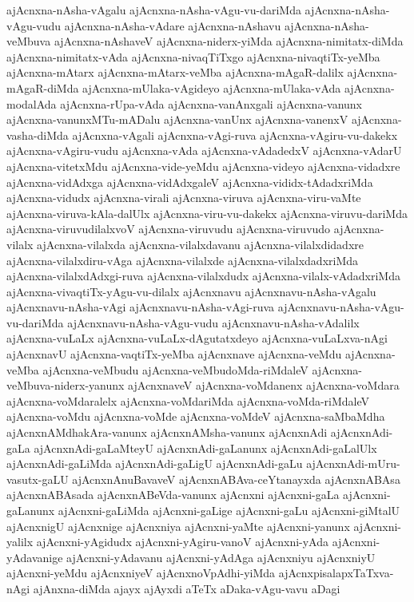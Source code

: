 {ajAcnxna-nAsha-vAgalu
ajAcnxna-nAsha-vAgu-vu-dariMda
ajAcnxna-nAsha-vAgu-vudu
ajAcnxna-nAsha-vAdare
ajAcnxna-nAshavu
ajAcnxna-nAsha-veMbuva
ajAcnxna-nAshaveV
ajAcnxna-niderx-yiMda
ajAcnxna-nimitatx-diMda
ajAcnxna-nimitatx-vAda
ajAcnxna-nivaqTiTxgo
ajAcnxna-nivaqtiTx-yeMba
ajAcnxna-mAtarx
ajAcnxna-mAtarx-veMba
ajAcnxna-mAgaR-dalilx
ajAcnxna-mAgaR-diMda
ajAcnxna-mUlaka-vAgideyo
ajAcnxna-mUlaka-vAda
ajAcnxna-modalAda
ajAcnxna-rUpa-vAda
ajAcnxna-vanAnxgali
ajAcnxna-vanunx
ajAcnxna-vanunxMTu-mADalu
ajAcnxna-vanUnx
ajAcnxna-vanenxV
ajAcnxna-vasha-diMda
ajAcnxna-vAgali
ajAcnxna-vAgi-ruva
ajAcnxna-vAgiru-vu-dakekx
ajAcnxna-vAgiru-vudu
ajAcnxna-vAda
ajAcnxna-vAdadedxV
ajAcnxna-vAdarU
ajAcnxna-vitetxMdu
ajAcnxna-vide-yeMdu
ajAcnxna-videyo
ajAcnxna-vidadxre
ajAcnxna-vidAdxga
ajAcnxna-vidAdxgaleV
ajAcnxna-vididx-tAdadxriMda
ajAcnxna-vidudx
ajAcnxna-virali
ajAcnxna-viruva
ajAcnxna-viru-vaMte
ajAcnxna-viruva-kAla-dalUlx
ajAcnxna-viru-vu-dakekx
ajAcnxna-viruvu-dariMda
ajAcnxna-viruvudilalxvoV
ajAcnxna-viruvudu
ajAcnxna-viruvudo
ajAcnxna-vilalx
ajAcnxna-vilalxda
ajAcnxna-vilalxdavanu
ajAcnxna-vilalxdidadxre
ajAcnxna-vilalxdiru-vAga
ajAcnxna-vilalxde
ajAcnxna-vilalxdadxriMda
ajAcnxna-vilalxdAdxgi-ruva
ajAcnxna-vilalxdudx
ajAcnxna-vilalx-vAdadxriMda
ajAcnxna-vivaqtiTx-yAgu-vu-dilalx
ajAcnxnavu
ajAcnxnavu-nAsha-vAgalu
ajAcnxnavu-nAsha-vAgi
ajAcnxnavu-nAsha-vAgi-ruva
ajAcnxnavu-nAsha-vAgu-vu-dariMda
ajAcnxnavu-nAsha-vAgu-vudu
ajAcnxnavu-nAsha-vAdalilx
ajAcnxna-vuLaLx
ajAcnxna-vuLaLx-dAgutatxdeyo
ajAcnxna-vuLaLxva-nAgi
ajAcnxnavU
ajAcnxna-vaqtiTx-yeMba
ajAcnxnave
ajAcnxna-veMdu
ajAcnxna-veMba
ajAcnxna-veMbudu
ajAcnxna-veMbudoMda-riMdaleV
ajAcnxna-veMbuva-niderx-yanunx
ajAcnxnaveV
ajAcnxna-voMdanenx
ajAcnxna-voMdara
ajAcnxna-voMdaralelx
ajAcnxna-voMdariMda
ajAcnxna-voMda-riMdaleV
ajAcnxna-voMdu
ajAcnxna-voMde
ajAcnxna-voMdeV
ajAcnxna-saMbaMdha
ajAcnxnAMdhakAra-vanunx
ajAcnxnAMsha-vanunx
ajAcnxnAdi
ajAcnxnAdi-gaLa
ajAcnxnAdi-gaLaMteyU
ajAcnxnAdi-gaLanunx
ajAcnxnAdi-gaLalUlx
ajAcnxnAdi-gaLiMda
ajAcnxnAdi-gaLigU
ajAcnxnAdi-gaLu
ajAcnxnAdi-mUru-vasutx-gaLU
ajAcnxnAnuBavaveV
ajAcnxnABAva-ceYtanayxda
ajAcnxnABAsa
ajAcnxnABAsada
ajAcnxnABeVda-vanunx
ajAcnxni
ajAcnxni-gaLa
ajAcnxni-gaLanunx
ajAcnxni-gaLiMda
ajAcnxni-gaLige
ajAcnxni-gaLu
ajAcnxni-giMtalU
ajAcnxnigU
ajAcnxnige
ajAcnxniya
ajAcnxni-yaMte
ajAcnxni-yanunx
ajAcnxni-yalilx
ajAcnxni-yAgidudx
ajAcnxni-yAgiru-vanoV
ajAcnxni-yAda
ajAcnxni-yAdavanige
ajAcnxni-yAdavanu
ajAcnxni-yAdAga
ajAcnxniyu
ajAcnxniyU
ajAcnxni-yeMdu
ajAcnxniyeV
ajAcnxnoVpAdhi-yiMda
ajAcnxpisalapxTaTxva-nAgi
ajAnxna-diMda
ajayx
ajAyxdi
aTeTx
aDaka-vAgu-vavu
aDagi
}
